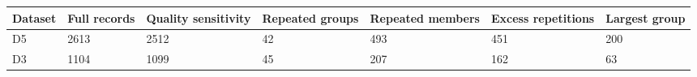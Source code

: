\begin{tabular}{lllllll}
\toprule
Dataset & Full records & Quality sensitivity & Repeated groups & Repeated members & Excess repetitions & Largest group \\
\midrule
D5 & 2613 & 2512 & 42 & 493 & 451 & 200 \\
D3 & 1104 & 1099 & 45 & 207 & 162 & 63 \\
\bottomrule
\end{tabular}
